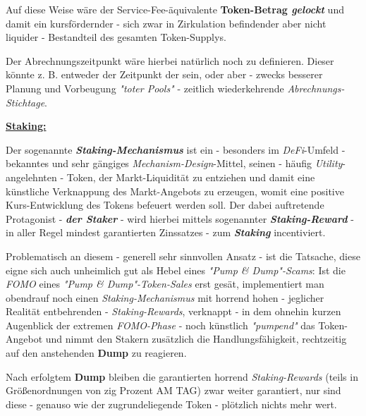 \begin{Konzept}
\vspace{0.1cm}

Auf diese Weise wäre der Service-Fee-äquivalente \textbf{Token-Betrag \textit{gelockt}} und damit ein kursfördernder - sich zwar in Zirkulation befindender aber nicht liquider - Bestandteil des gesamten Token-Supplys.

\vspace{0.2cm}

Der Abrechnungszeitpunkt wäre hierbei natürlich noch zu definieren. Dieser könnte z. B. entweder der Zeitpunkt der  sein, oder aber - zwecks besserer Planung und Vorbeugung \textit{"toter Pools"} - zeitlich wiederkehrende \textit{Abrechnungs-Stichtage}.

\vspace{0.75cm}

\underline{\textbf{Staking:}}

\vspace{0.3cm}

Der sogenannte \textbf{\textit{Staking-Mechanismus}} ist ein - besonders im \textit{DeFi}-Umfeld - bekanntes und sehr gängiges \textit{Mechanism-Design}-Mittel, seinen - häufig \textit{Utility}-angelehnten - Token, der Markt-Liquidität zu entziehen und damit eine künstliche Verknappung des Markt-Angebots zu erzeugen, womit eine positive Kurs-Entwicklung des Tokens befeuert werden soll. Der dabei auftretende Protagonist - \textbf{\textit{der Staker}} - wird hierbei mittels sogenannter \textbf{\textit{Staking-Reward}} - in aller Regel mindest garantiert\-en Zinssatzes - zum \textbf{\textit{Staking}} incentiviert.

\vspace{0.2cm}

Problematisch an diesem - generell sehr sinnvollen Ansatz - ist die Tatsache, diese eigne sich auch unheimlich gut als Hebel eines \textit{"Pump \& Dump"-Scams}: Ist die \textit{FOMO} eines \textit{"Pump \& Dump"-Token-Sales} erst gesät, implementiert man obendrauf noch einen \textit{Staking-Mechanismus} mit horrend hohen - jeglicher Realität entbehrenden - \textit{Staking-Rewards}, verknappt - in dem ohnehin kurzen Augenblick der extremen \textit{FOMO-Phase} - noch künstlich \textit{"pumpend"} das Token-Angebot und nimmt den Stakern zusätzlich die Handlungsfähigkeit, rechtzeitig auf den anstehenden \textbf{Dump} zu reagieren. 

Nach erfolgtem \textbf{Dump} bleiben die garantierten horrend \textit{Staking-Rewards} (teils in Größenordnungen von zig Prozent AM TAG) zwar weiter garantiert, nur sind diese - genauso wie der zugrundeliegende Token - plötzlich nichts mehr wert.


\end{Konzept}
